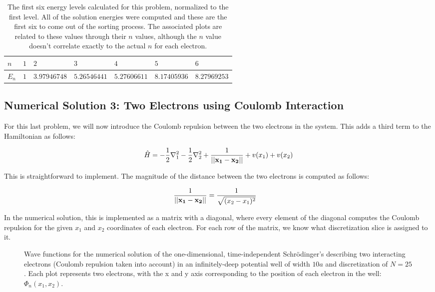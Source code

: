\documentclass[10pt, oneside, letterpaper]{article}
\begin{document}
\begin{table}
\begin{center}
\begin{tabular}{l|llllll}\hline
$n$    & $1$    & $2$     & $3$     & $4$      & $5$      & $6$      \\\hline
$E_n$  & $1$  & $3.97946748$  & $5.26546441$  & $5.27606611$  & $8.17405936$  & $8.27969253$ \\\hline
\end{tabular}
\end{center}
  \caption{The first six energy levels calculated for this problem, normalized to the first level. All of the solution energies were computed and these are the first six to come out of the sorting process. The associated plots are related to these values through their $n$ values, although the $n$ value doesn't correlate exactly to the actual $n$ for each electron.}
  \label{numerical-energies-2}
\end{table}

\subsection{Numerical Solution 3: Two Electrons using Coulomb Interaction}

For this last problem, we will now introduce the Coulomb repulsion between the two electrons in the system. This adds a third term to the Hamiltonian as follows:

\begin{align*}
  \hat{H} &= -\frac{1}{2}\nabla^{2}_1 -\frac{1}{2}\nabla^{2}_2 + \frac{1}{\left|\left|\bf{x_1} - \bf{x_2}\right|\right|} + v(x_1) + v(x_2)\\
\end{align*}

This is straightforward to implement. The magnitude of the distance between the two electrons is computed as follows:

\begin{align*}
  \frac{1}{\left|\left|\bf{x_1} - \bf{x_2}\right|\right|} &= \frac{1}{\sqrt{(x_2 - x_1)^2}}
\end{align*}

In the numerical solution, this is implemented as a matrix with a diagonal, where every element of the diagonal computes the Coulomb repulsion for the given $x_1$ and $x_2$ coordinates of each electron. For each row of the matrix, we know what discretization slice is assigned to it.

\begin{figure}[H]
  \begin{center}
    
  \end{center}
  \caption{Wave functions for the numerical solution of the one-dimensional, time-independent Schr\"{o}dinger's describing two interacting electrons (Coulomb repulsion taken into account) in an infinitely-deep potential well of width $10a$ and discretization of $N=25$. Each plot represents two electrons, with the x and y axis corresponding to the position of each electron in the well: $\Phi_n(x_1,x_2)$.}
  \label{numerical-plot-3}
\end{figure}
\end{document}
